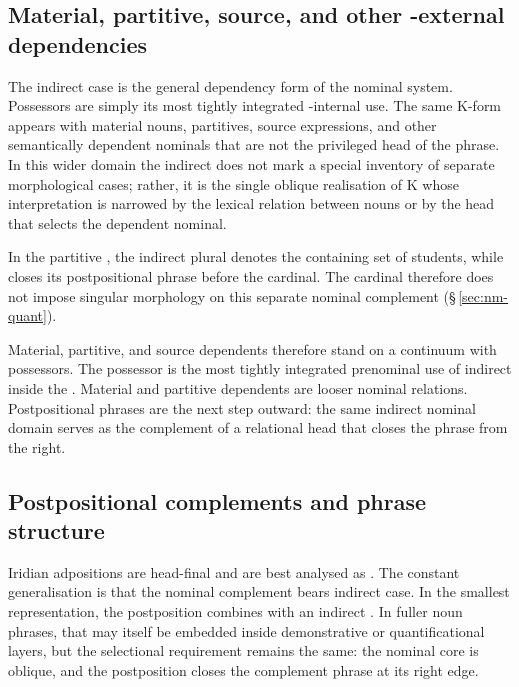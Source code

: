 \subsection{Material, partitive, source, and other -external
  dependencies}
\label{sec:nm-ext-indirect}

The indirect case is the general dependency form of the nominal
system. Possessors are simply its most tightly integrated -internal
use. The same K-form appears with material nouns, partitives, source
expressions, and other semantically dependent nominals that are not the
privileged head of the phrase. In this wider domain the indirect does
not mark a special inventory of separate morphological cases; rather, it
is the single oblique realisation of K whose interpretation is narrowed
by the lexical relation between nouns or by the head that selects the
dependent nominal.

\pex
\a {} 
\a {} 
\a {} 
\a {} 
\xe

In the partitive , the indirect plural
 denotes the containing set of students, while 
closes its postpositional phrase before the cardinal. The cardinal therefore
does not impose singular morphology on this separate nominal complement
(§\,\ref{sec:nm-quant}).

Material, partitive, and source dependents therefore stand on a
continuum with possessors. The possessor is the most tightly integrated
prenominal use of indirect  inside the . Material and partitive
dependents are looser nominal relations. Postpositional phrases are the
next step outward: the same indirect nominal domain serves as the
complement of a relational head that closes the phrase from the right.

\subsection{Postpositional complements and phrase structure}
\label{sec:nm-postpositions}
\label{sec:nm-postp-structure}
\label{sec:nm-postp-attachment}

Iridian adpositions are head-final and are best analysed as
. The constant generalisation is that the nominal
complement bears indirect case. In the smallest representation, the
postposition combines with an indirect . In fuller noun phrases, that
 may itself be embedded inside demonstrative or quantificational layers, but the
selectional requirement remains the same: the nominal core is oblique,
and the postposition closes the complement phrase at its right edge.

